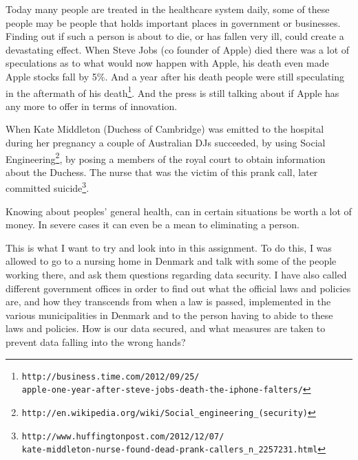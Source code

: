 \documentclass[11pt]{article}
\begin{document}
Today many people are treated in the healthcare system daily, some of these people may be people that holds important places in government or businesses. Finding out if such a person is about to die, or has fallen very ill, could create a devastating effect. When Steve Jobs (co founder of Apple) died there was a lot of speculations as to what would now happen with Apple, his death even made Apple stocks fall by 5\%. And a year after his death people were still speculating in the aftermath of his death\footnote{ \texttt{http://business.time.com/2012/09/25/ \\
apple-one-year-after-steve-jobs-death-the-iphone-falters/} }. And the press is still talking about if Apple has any more to offer in terms of innovation.

 When Kate Middleton (Duchess of Cambridge) was emitted to the hospital during her pregnancy a couple of Australian DJs succeeded, by using Social Engineering\footnote{ \texttt{http://en.wikipedia.org/wiki/Social\_engineering\_(security)} }, by posing a members of the royal court to obtain information about the Duchess. The nurse that was the victim of this prank call, later committed suicide\footnote{ \texttt{http://www.huffingtonpost.com/2012/12/07/\\kate-middleton-nurse-found-dead-prank-callers\_n\_2257231.html} }. 
 
Knowing about peoples' general health, can in certain situations be worth a lot of money. In severe cases it can even be a mean to eliminating a person. 
 
 This is what I want to try and look into in this assignment. To do this, I was allowed to go to a nursing home in Denmark and talk with some of the people working there, and ask them questions regarding data security. I have also called different government offices in order to find out what the official laws and policies are, and how they transcends from when a law is passed, implemented in the various municipalities in Denmark and to the person having to abide to these laws and policies. How is our data secured, and what measures are taken to prevent data falling into the wrong hands? 
\end{document}
